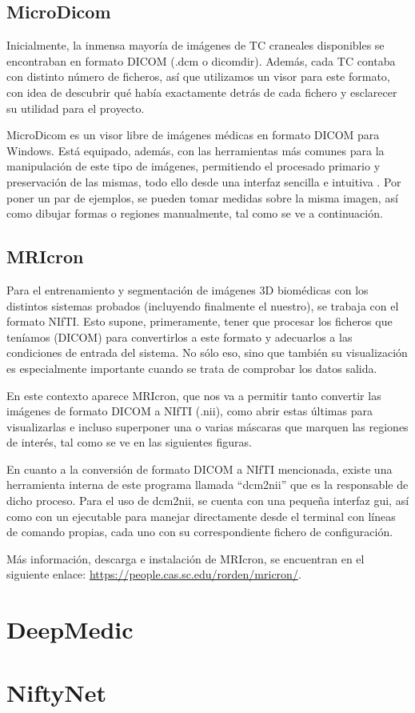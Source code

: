 \subsection{MicroDicom}

Inicialmente, la inmensa mayoría de imágenes de TC craneales disponibles se encontraban en formato DICOM (.dcm o dicomdir). Además, cada TC contaba con distinto número de ficheros, así que utilizamos un visor para este formato, con idea de descubrir qué había exactamente detrás de cada fichero y esclarecer su utilidad para el proyecto.
 
MicroDicom es un visor libre de imágenes médicas en formato DICOM para Windows. Está equipado, además, con las herramientas más comunes para la manipulación de este tipo de imágenes, permitiendo el procesado primario y preservación de las mismas, todo ello desde una interfaz sencilla e intuitiva \cite{microdicom}. Por  poner un par de ejemplos, se pueden tomar medidas sobre la misma imagen, así como dibujar formas o regiones manualmente, tal como se ve a continuación.


\subsection{MRIcron}

Para el entrenamiento y segmentación de imágenes 3D biomédicas con los distintos sistemas probados (incluyendo finalmente el nuestro), se trabaja con el formato NIfTI. Esto supone, primeramente, tener que procesar los ficheros que teníamos (DICOM) para convertirlos a este formato y adecuarlos a las condiciones de entrada del sistema. No sólo eso, sino que también su visualización es especialmente importante cuando se trata de comprobar los datos salida.

En este contexto aparece MRIcron, que nos va a permitir tanto convertir las imágenes de formato DICOM a NIfTI (.nii), como abrir estas últimas para visualizarlas e incluso superponer una o varias máscaras que marquen las regiones de interés, tal como se ve en las siguientes figuras.  

En cuanto a la conversión de formato DICOM a NIfTI mencionada, existe una herramienta interna de este programa llamada ``dcm2nii'' que es la responsable de dicho proceso. Para el uso de dcm2nii, se cuenta con una pequeña interfaz gui, así como con un ejecutable para manejar directamente desde el terminal con líneas de comando propias, cada uno con su correspondiente fichero de configuración.

Más información, descarga e instalación de MRIcron, se encuentran en el siguiente enlace: \url{https://people.cas.sc.edu/rorden/mricron/}.


\section{DeepMedic}


\section{NiftyNet}

